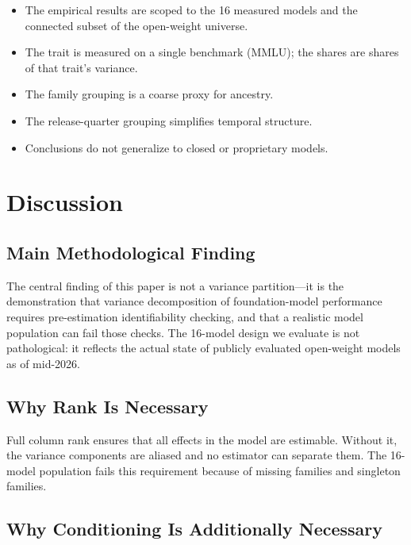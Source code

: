 \documentclass[journal]{IEEEtran}
\begin{document}
\begin{itemize}
\item The empirical results are scoped to the 16 measured models and the connected subset of the open-weight universe.
\item The trait is measured on a single benchmark (MMLU); the shares are shares of that trait's variance.
\item The family grouping is a coarse proxy for ancestry.
\item The release-quarter grouping simplifies temporal structure.
\item Conclusions do not generalize to closed or proprietary models.
\end{itemize}

\section{Discussion}
\label{sec:discussion}

\subsection{Main Methodological Finding}

The central finding of this paper is not a variance partition---it is the demonstration that variance decomposition of foundation-model performance requires pre-estimation identifiability checking, and that a realistic model population can fail those checks. The 16-model design we evaluate is not pathological: it reflects the actual state of publicly evaluated open-weight models as of mid-2026.

\subsection{Why Rank Is Necessary}

Full column rank ensures that all effects in the model are estimable. Without it, the variance components are aliased and no estimator can separate them. The 16-model population fails this requirement because of missing families and singleton families.

\subsection{Why Conditioning Is Additionally Necessary}
\end{document}
